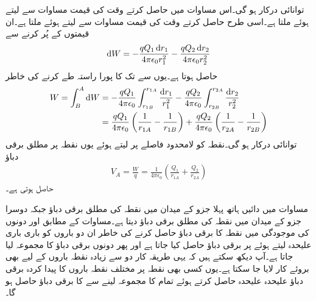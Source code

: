 توانائی درکار ہو گی۔اس مساوات میں  حاصل کرتے وقت  کی قیمت مساوات  سے لیتے ہوئے  ملتا ہے۔اسی طرح  حاصل کرتے وقت  کی قیمت مساوات  سے لیتے ہوئے  ملتا ہے۔ان قیمتوں کے پُر کرنے سے
\begin{align*}
\dif W=- \frac{q Q_1 \dif r_1}{4\pi \epsilon_0 r_1^2} - \frac{q Q_2 \dif r_2}{4\pi \epsilon_0 r_2^2} 
\end{align*}
حاصل ہوتا ہے۔یوں  سے  تک کا پورا راستہ طے کرنے کی خاطر
\begin{align*}
W=\int_B^A \dif W&=- \frac{q Q_1 }{4\pi \epsilon_0} \int_{r_{1B}}^{r_{1A}} \frac{\dif r_1}{r_1^2} -\frac{q Q_2 }{4\pi \epsilon_0} \int_{r_{2B}}^{r_{2A}} \frac{\dif r_2}{r_2^2}\\
&=\frac{q Q_1 }{4\pi \epsilon_0} \left(\frac{1}{r_{1A}}-\frac{1}{r_{1B}} \right)+\frac{q Q_2 }{4\pi \epsilon_0} \left(\frac{1}{r_{2A}}-\frac{1}{r_{2B}} \right)
\end{align*}
توانائی درکار ہو گی۔نقطہ  کو لامحدود فاصلے پر لیتے ہوئے یوں نقطہ  پر مطلق برقی دباؤ
\begin{align}\label{مساوات_توانائی_نقطہ_بار_کی_حتمی_دباو_پ}
V_A=\frac{W}{q}=\frac{1}{4\pi \epsilon_0} \left(\frac{Q_1}{r_{1A}}+\frac{Q_2}{r_{2A}} \right)
\end{align}
حاصل ہوتی ہے۔

مساوات  میں دائیں ہاتھ پہلا جزو  کے میدان میں نقطہ  کی مطلق برقی دباؤ جبکہ
 دوسرا جزو  کے میدان میں نقطہ  کی مطلق برقی دباؤ دیتا ہے۔مساوات    کے مطابق  اور  دونوں کی موجودگی میں نقطہ  کا برقی دباؤ حاصل کرنے کی خاطر ان دو باروں کو باری باری علیحدہ لیتے ہوئے  پر برقی دباؤ حاصل کیا جاتا ہے اور پھر دونوں برقی دباؤ کا مجموعہ لیا جاتا ہے۔آپ دیکھ سکتے ہیں کہ یہی طریقہ کار دو سے زیادہ نقطہ باروں کے لیے بھی بروئے کار لایا جا سکتا ہے۔یوں کسی بھی نقطہ  پر  مختلف نقطہ باروں کا پیدا کردہ برقی دباؤ علیحدہ علیحدہ حاصل کرتے ہوئے تمام کا مجموعہ لینے سے   کا برقی دباؤ حاصل ہو گا۔

